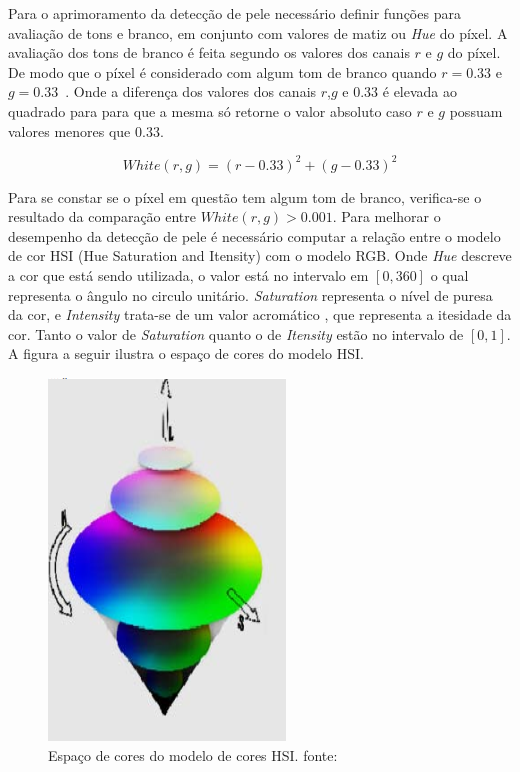 \documentclass[journal,onecolumn]{IEEEtran}
\begin{document}
	Para o aprimoramento da detecção de pele necessário definir funções para avaliação de tons e branco, em conjunto com valores de matiz ou \textit{Hue} do píxel.
	A avaliação dos tons de branco é feita segundo os valores dos canais $r$ e $g$ do píxel. 
	De modo que o píxel é considerado com algum tom de branco quando $r=0.33$ e $g=0.33$~\cite{chen2007simple}.
	Onde a diferença dos valores dos canais $r$,$g$ e $0.33$ é elevada ao quadrado para para que a mesma só retorne o valor absoluto caso $r$ e $g$ possuam valores menores que $0.33$.
	
	\begin{equation}
		White(r,g) = (r - 0.33)^2 + (g - 0.33)^2 
		\label{eq:whiteValue}
	\end{equation}
	
	Para se constar se o píxel em questão tem algum tom de branco, verifica-se o resultado da comparação entre $White(r,g) > 0.001$.
	Para melhorar o desempenho da detecção de pele é necessário computar a relação entre o modelo de cor HSI (Hue Saturation and Itensity) com o modelo RGB.
	Onde \textit{Hue} descreve a cor que está sendo utilizada, o valor está no intervalo em $[0,360]$ o qual representa o ângulo no circulo unitário.
	\textit{Saturation} representa o nível de puresa da cor, e \textit{Intensity} trata-se de um valor acromático , que representa a itesidade da cor.
	Tanto o valor de \textit{Saturation} quanto o de \textit{Itensity} estão no intervalo de $[0,1]$.
	A figura a seguir ilustra o espaço de cores do modelo HSI. 

		\begin{figure}[htb]
		\begin{center}		
			\includegraphics[scale=0.3]{espaco_hsi.png}
			\caption{Espaço de cores do modelo de cores HSI. fonte:\cite{ibraheem2012understanding} }
			\label{fig:espacoCoresHSI}
		\end{center}
		\end{figure}
	
\end{document}
